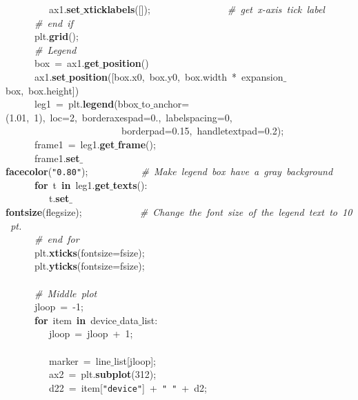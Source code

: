 \mbox{}\ \ \ \ \ \ \ \ \ ax1.\textbf{set$\_$xticklabels}([]);\ \ \ \ \ \ \ \ \ \ \ \ \ \ \ \ \textit{\#\ get\ x-axis\ tick\ label} \\
\mbox{}\ \ \ \ \ \ \textit{\#\ end\ if} \\
\mbox{}\ \ \ \ \ \ plt.\textbf{grid}(); \\
\mbox{}\ \ \ \ \ \ \textit{\#\ Legend} \\
\mbox{}\ \ \ \ \ \ box\ =\ ax1.\textbf{get$\_$position}() \\
\mbox{}\ \ \ \ \ \ ax1.\textbf{set$\_$position}([box.x0,\ box.y0,\ box.width\ *\ expansion$\_$box,\ box.height]) \\
\mbox{}\ \ \ \ \ \ leg1\ =\ plt.\textbf{legend}(bbox$\_$to$\_$anchor=(1.01,\ 1),\ loc=2,\ borderaxespad=0.,\ labelspacing=0,\  \\
\mbox{}\ \ \ \ \ \ \ \ \ \ \ \ \ \ \ \ \ \ \ \ \ \ \ \ borderpad=0.15,\ handletextpad=0.2); \\
\mbox{}\ \ \ \ \ \ frame1\ =\ leg1.\textbf{get$\_$frame}(); \\
\mbox{}\ \ \ \ \ \ frame1.\textbf{set$\_$facecolor}(\texttt{"{}0.80"{}});\ \ \ \ \ \ \ \ \ \ \ \textit{\#\ Make\ legend\ box\ have\ a\ gray\ background} \\
\mbox{}\ \ \ \ \ \ \textbf{for}\ t\ \textbf{in}\ leg1.\textbf{get$\_$texts}(): \\
\mbox{}\ \ \ \ \ \ \ \ \ t.\textbf{set$\_$fontsize}(flegsize);\ \ \ \ \ \ \ \ \ \ \ \ \textit{\#\ Change\ the\ font\ size\ of\ the\ legend\ text\ to\ 10\ pt.} \\
\mbox{}\ \ \ \ \ \ \textit{\#\ end\ for} \\
\mbox{}\ \ \ \ \ \ plt.\textbf{xticks}(fontsize=fsize); \\
\mbox{}\ \ \ \ \ \ plt.\textbf{yticks}(fontsize=fsize); \\
\mbox{}\ \ \ \ \ \  \\
\mbox{}\ \ \ \ \ \ \textit{\#\ Middle\ plot} \\
\mbox{}\ \ \ \ \ \ jloop\ =\ -1; \\
\mbox{}\ \ \ \ \ \ \textbf{for}\ item\ \textbf{in}\ device$\_$data$\_$list: \\
\mbox{}\ \ \ \ \ \ \ \ \ jloop\ =\ jloop\ +\ 1; \\
\mbox{}\ \ \ \ \ \ \ \ \  \\
\mbox{}\ \ \ \ \ \ \ \ \ marker\ =\ line$\_$list[jloop]; \\
\mbox{}\ \ \ \ \ \ \ \ \ ax2\ =\ plt.\textbf{subplot}(312); \\
\mbox{}\ \ \ \ \ \ \ \ \ d22\ =\ item[\texttt{"{}device"{}}]\ +\ \texttt{"{}\ "{}}\ +\ d2; \\
